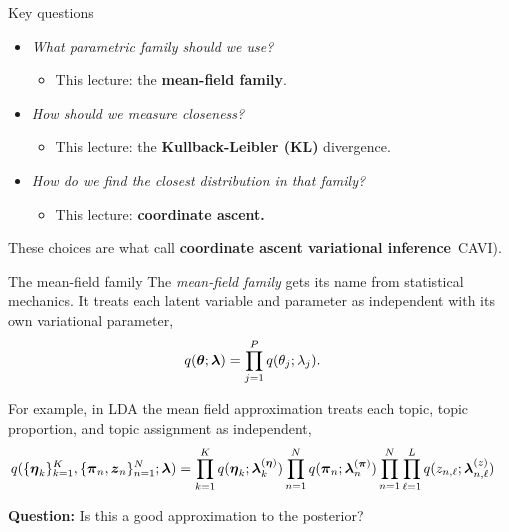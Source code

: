 \documentclass[aspectratio=169]{beamer}
\begin{document}
\begin{frame}{Key questions}
\begin{itemize}
    \item \textit{What parametric family should we use? }
    \begin{itemize}
        \item This lecture: the \textbf{mean-field family}.
    \end{itemize}
    
    \item \textit{How should we measure closeness? }
    \begin{itemize}
        \item This lecture: the \textbf{Kullback-Leibler (KL)} divergence.
    \end{itemize}
    
    \item \textit{How do we find the closest distribution in that family?}
    \begin{itemize}
        \item This lecture: \textbf{coordinate ascent.}
    \end{itemize}
\end{itemize}

These choices are what \citet{Blei2017-yc} call \textbf{coordinate ascent variational inference}~CAVI).
\end{frame}

\begin{frame}{The mean-field family}
The \textit{mean-field family} gets its name from statistical mechanics. It treats each latent variable and parameter as independent with its own variational parameter,
\begin{align}
    q(\boldsymbol{\theta}; \boldsymbol{\lambda}) &= \prod_{j=1}^P q(\theta_j; \lambda_j).
\end{align}

For example, in LDA the mean field approximation treats each topic, topic proportion, and topic assignment as independent,
\begin{align}
    q(\{\boldsymbol{\eta}_k\}_{k=1}^K, \{\boldsymbol{\pi}_n, \boldsymbol{z}_n\}_{n=1}^N; \boldsymbol{\lambda}) &= \prod_{k=1}^K q(\boldsymbol{\eta}_k; \boldsymbol{\lambda}_k^{(\boldsymbol{\eta})}) 
    \prod_{n=1}^N q(\boldsymbol{\pi}_n; \boldsymbol{\lambda}_n^{(\boldsymbol{\pi})}) 
    \prod_{n=1}^N \prod_{\ell=1}^L q(z_{n, \ell}; \boldsymbol{\lambda}_{n, \ell}^{(z)})
\end{align}

\textbf{Question: } Is this a good approximation to the posterior? 

\end{frame}
\end{document}
